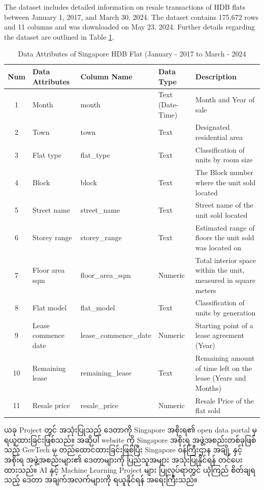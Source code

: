 The dataset includes detailed information on resale transactions of HDB flats between January 1, 2017, and March 30, 2024. The dataset contains 175,672 rows and 11 columns and was downloaded on May 23, 2024.  Further details regarding the dataset are outlined in Table \ref{tab:data_attributes}. 

\vspace{0.5em}

\begin{table}[h]
\centering
\caption{Data Attributes of Singapore HDB Flat (January - 2017 to March  - 2024}
\label{tab:data_attributes}
{\scriptsize
\begin{tabular}{|c|l|l|l|l|}
\hline
\textbf{Num} & \textbf{Data Attributes} & \textbf{Column Name} & \textbf{Data Type} & \textbf{Description} \\ \hline
1 & Month & month & Text (Date-Time) & Month and Year of sale \\ \hline
2 & Town & town & Text & Designated residential area \\ \hline
3 & Flat type & flat\_type & Text & Classification of units by room size \\ \hline
4 & Block & block & Text & The Block number where the unit sold located \\ \hline
5 & Street name & street\_name & Text & Street name of the unit sold located \\ \hline
6 & Storey range & storey\_range & Text & Estimated range of floors the unit sold was located on \\ \hline
7 & Floor area sqm & floor\_area\_sqm & Numeric & Total interior space within the unit, measured in square meters \\ \hline
8 & Flat model & flat\_model & Text & Classification of units by generation \\ \hline
9 & Lease commence date & lease\_commence\_date & Numeric & Starting point of a lease agreement (Year) \\ \hline
10 & Remaining lease & remaining\_lease & Text & Remaining amount of time left on the lease (Years and Months) \\ \hline
11 & Resale price & resale\_price & Numeric & Resale Price of the flat sold \\ \hline
\end{tabular}}
\end{table}

\noindent ယခု Project တွင် အသုံးပြုသည့် ဒေတာကို Singapore အစိုးရ၏ open data portal \cite{web:SGdata} မှ ရယူထားခြင်းဖြစ်သည်။ အဆိုပါ website ကို Singapore အစိုးရ အဖွဲ့အစည်းတစ်ခုဖြစ်သည့် GovTech မှ တည်ထောင်ထားခြင်းဖြစ်ပြီး Singapore ၀န်ကြီးဌာန အချို့ နှင့် အစိုးရ အဖွဲ့အစည်းများ၏ ဒေတာများကို ပြည်သူအများ အသုံးပြုနိုင်ရန် တင်ပေးထားသည်။ AI နှင့်  Machine Learning Project များ ပြုလုပ်ရာတွင် ယုံကြည် စိတ်ချရသည့် ဒေတာ အချက်အလက်များကို ရယူနိုင်ရန် အရေးကြီးသည်။ 

